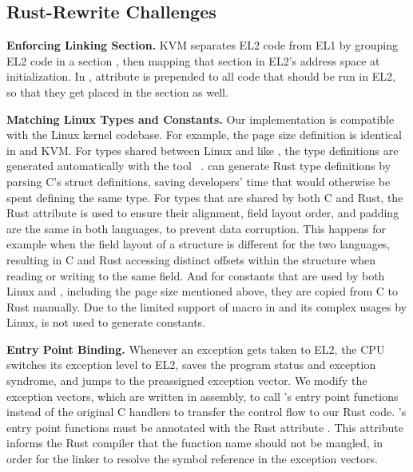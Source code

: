 \subsection{Rust-Rewrite Challenges}
\textbf{Enforcing Linking Section.}
KVM separates EL2 code from EL1 by grouping EL2 code in a section
, then mapping that section in EL2's address space at
initialization.
In \rustcore{}, attribute \code{\#[link\_section = ".hyp.text"]} is prepended
to all code that should be run in EL2, so that they get placed in the
 section as well.

\textbf{Matching Linux Types and Constants.}
Our implementation is compatible with the Linux kernel codebase. For example,
the page size definition is identical in \rustcore{} and KVM.
For types shared between Linux and \rustcore{} like , the type
definitions are generated automatically with the tool
~\cite{bindgen}.  can generate Rust type
definitions by parsing C's struct definitions, saving developers' time that
would otherwise be spent defining the same type.
For types that are shared by both C and Rust, the Rust attribute
\code{\#[repr\-(C)]} is used to ensure their alignment, field layout order, and
padding are the same in both languages, to prevent data corruption. This
happens for example when the field layout of a structure is different for the
two languages, resulting in C and Rust accessing distinct offsets within the
structure when reading or writing to the same field.
And for constants that are used by both Linux
and \rustcore{}, including the page size mentioned above, they are copied from C
to Rust manually. Due to the limited support of macro in  and its
complex usages by Linux,  is not used to generate constants.

\textbf{Entry Point Binding.}
Whenever an exception gets taken to EL2, the CPU switches its exception level
to EL2, saves the program status and exception syndrome, and jumps to the
preassigned exception vector.
We modify the exception vectors, which are written in assembly, to call
\rustcore{}'s entry point functions instead of the original C handlers to
transfer the control flow to our Rust code.
\rustcore{}'s entry point functions must be annotated with the Rust attribute
\code{\#[no\_mangle]}. This attribute informs the Rust compiler that the
function name should not be mangled, in order for the linker to resolve the
symbol reference in the exception vectors.

